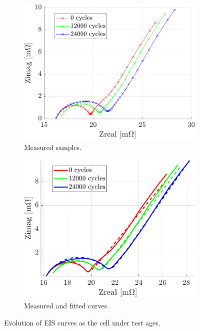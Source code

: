\begin{figure}[hbp]
    \centering
\begin{subfigure}{0.49\textwidth}
    \centering
    \includegraphics[width=\textwidth]{figures/14/EIS-impedance-measured.pdf}
    \caption{Measured samples.}
    \label{fig:14-EIS-measured}
    \end{subfigure}
    \hfill
    \begin{subfigure}{0.49\textwidth}
    \centering
    \includegraphics[width=\textwidth]{figures/14/EIS-impedance-fit.pdf}
    \caption{Measured and fitted curves.}
    \label{fig:14-EIS-fit}
    \end{subfigure}
    
    \caption{Evolution of EIS curves as the cell under test ages.}
    \label{fig:14-EIS}
\end{figure}

